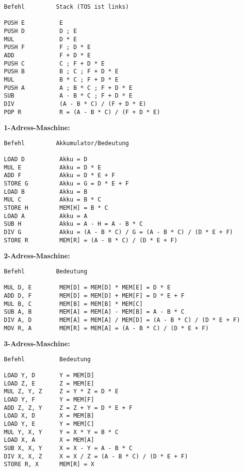 \documentclass[a4paper,10pt]{scrartcl}
\begin{document}
\begin{enumerate}
\begin{enumerate}
                \begin{verbatim}Befehl         Stack (TOS ist links)

PUSH E          E
PUSH D          D ; E
MUL             D * E
PUSH F          F ; D * E
ADD             F + D * E
PUSH C          C ; F + D * E
PUSH B          B ; C ; F + D * E
MUL             B * C ; F + D * E
PUSH A          A ; B * C ; F + D * E
SUB             A - B * C ; F + D * E
DIV             (A - B * C) / (F + D * E)
POP R           R = (A - B * C) / (F + D * E)
\end{verbatim}

                \textbf{1-Adress-Maschine:}

                \begin{verbatim}Befehl         Akkumulator/Bedeutung

LOAD D          Akku = D
MUL E           Akku = D * E
ADD F           Akku = D * E + F
STORE G         Akku = G = D * E + F
LOAD B          Akku = B
MUL C           Akku = B * C
STORE H         MEM[H] = B * C
LOAD A          Akku = A
SUB H           Akku = A - H = A - B * C
DIV G           Akku = (A - B * C) / G = (A - B * C) / (D * E + F)
STORE R         MEM[R] = (A - B * C) / (D * E + F)
\end{verbatim}

                \textbf{2-Adress-Maschine:}

                \begin{verbatim}Befehl         Bedeutung

MUL D, E        MEM[D] = MEM[D] * MEM[E] = D * E
ADD D, F        MEM[D] = MEM[D] + MEM[F] = D * E + F
MUL B, C        MEM[B] = MEM[B] * MEM[C]
SUB A, B        MEM[A] = MEM[A] - MEM[B] = A - B * C
DIV A, D        MEM[A] = MEM[A] / MEM[D] = (A - B * C) / (D * E + F)
MOV R, A        MEM[R] = MEM[A] = (A - B * C) / (D * E + F)
\end{verbatim}

                \textbf{3-Adress-Maschine:}

                \begin{verbatim}Befehl          Bedeutung

LOAD Y, D       Y = MEM[D]
LOAD Z, E       Z = MEM[E]
MUL Z, Y, Z     Z = Y * Z = D * E
LOAD Y, F       Y = MEM[F]
ADD Z, Z, Y     Z = Z + Y = D * E + F
LOAD X, D       X = MEM[B]
LOAD Y, E       Y = MEM[C]
MUL Y, X, Y     Y = X * Y = B * C
LOAD X, A       X = MEM[A]
SUB X, X, Y     X = X - Y = A - B * C
DIV X, X, Z     X = X / Z = (A - B * C) / (D * E + F)
STORE R, X      MEM[R] = X
\end{verbatim}


\end{enumerate}
\end{enumerate}
\end{document}
